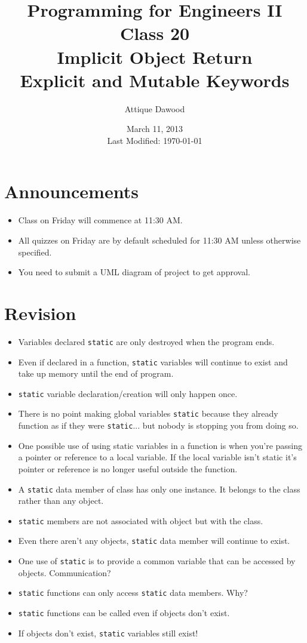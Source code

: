 \documentclass[12pt,a4paper]{article}
\title{\vspace{-2cm}Programming for Engineers II\\Class 20\\Implicit Object Return\\Explicit and Mutable Keywords}
\author{Attique Dawood}
\date{March 11, 2013\\[0.2cm] Last Modified: \today}
\begin{document}
\maketitle
\section{Announcements}
\begin{itemize}
\item Class on Friday will commence at 11:30 AM.
\item All quizzes on Friday are by default scheduled for 11:30 AM unless otherwise specified.
\item You need to submit a UML diagram of project to get approval.
\end{itemize}
\section{Revision}
\begin{itemize}
\item Variables declared \verb|static| are only destroyed when the program ends.
\item Even if declared in a function, \verb|static| variables will continue to exist and take up memory until the end of program.
\item \verb|static| variable declaration/creation will only happen once.
\item There is no point making global variables \verb|static| because they already function as if they were \verb|static|... but nobody is stopping you from doing so.
\item One possible use of using static variables in a function is when you're passing a pointer or reference to a local variable. If the local variable isn't static it's pointer or reference is no longer useful outside the function.
\item A \verb|static| data member of class has only one instance. It belongs to the class rather than any object.
\item \verb|static| members are not associated with object but with the class.
\item Even there aren't any objects, \verb|static| data member will continue to exist.
\item One use of \verb|static| is to provide a common variable that can be accessed by objects. Communication?
\item \verb|static| functions can only access \verb|static| data members. Why?
\item \verb|static| functions can be called even if objects don't exist.
\item If objects don't exist, \verb|static| variables still exist!
\end{itemize}
\end{document}

